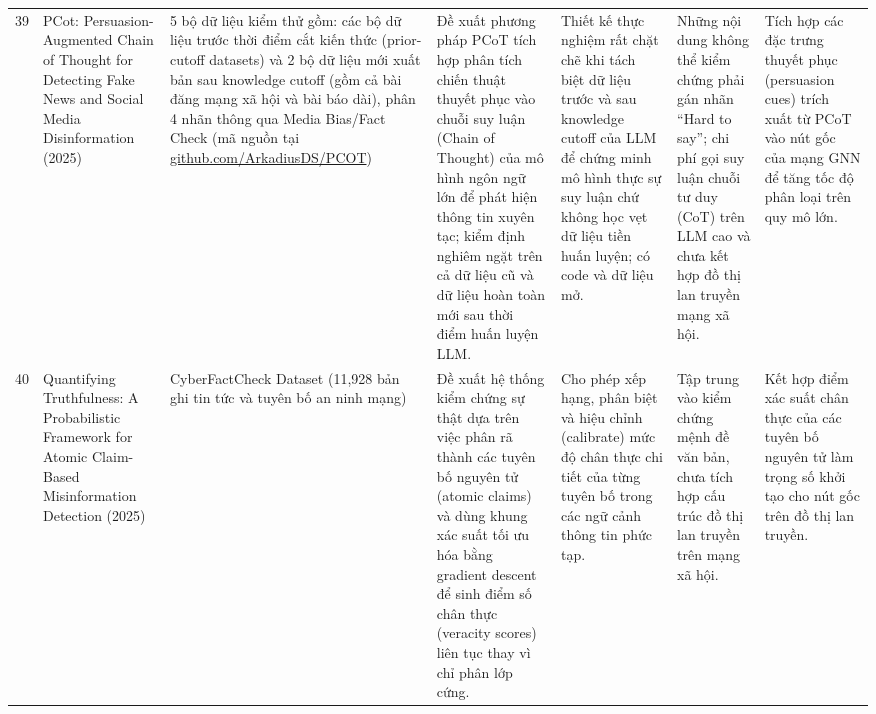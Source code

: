 \documentclass[11pt,a4paper]{extreport}
\begin{document}
\begin{landscape}
\begin{longtable}{@{}C{0.6cm}p{3.6cm}p{2.7cm}p{4.8cm}p{3.6cm}p{3.6cm}p{3.6cm}@{}}
39 & PCot: Persuasion-Augmented Chain of Thought for Detecting Fake News and Social Media Disinformation (2025) \cite{noauthor_pcot_2025} & 5 bộ dữ liệu kiểm thử gồm: các bộ dữ liệu trước thời điểm cắt kiến thức (prior-cutoff datasets) và 2 bộ dữ liệu mới xuất bản sau knowledge cutoff (gồm cả bài đăng mạng xã hội và bài báo dài), phân 4 nhãn thông qua Media Bias/Fact Check (mã nguồn tại \url{github.com/ArkadiusDS/PCOT}) & Đề xuất phương pháp PCoT tích hợp phân tích chiến thuật thuyết phục vào chuỗi suy luận (Chain of Thought) của mô hình ngôn ngữ lớn để phát hiện thông tin xuyên tạc; kiểm định nghiêm ngặt trên cả dữ liệu cũ và dữ liệu hoàn toàn mới sau thời điểm huấn luyện LLM. & Thiết kế thực nghiệm rất chặt chẽ khi tách biệt dữ liệu trước và sau knowledge cutoff của LLM để chứng minh mô hình thực sự suy luận chứ không học vẹt dữ liệu tiền huấn luyện; có code và dữ liệu mở. & Những nội dung không thể kiểm chứng phải gán nhãn ``Hard to say''; chi phí gọi suy luận chuỗi tư duy (CoT) trên LLM cao và chưa kết hợp đồ thị lan truyền mạng xã hội. & Tích hợp các đặc trưng thuyết phục (persuasion cues) trích xuất từ PCoT vào nút gốc của mạng GNN để tăng tốc độ phân loại trên quy mô lớn. \\ 

40 & Quantifying Truthfulness: A Probabilistic Framework for Atomic Claim-Based Misinformation Detection (2025) \cite{noauthor_quantifying_2025} & CyberFactCheck Dataset (11,928 bản ghi tin tức và tuyên bố an ninh mạng) & Đề xuất hệ thống kiểm chứng sự thật dựa trên việc phân rã thành các tuyên bố nguyên tử (atomic claims) và dùng khung xác suất tối ưu hóa bằng gradient descent để sinh điểm số chân thực (veracity scores) liên tục thay vì chỉ phân lớp cứng. & Cho phép xếp hạng, phân biệt và hiệu chỉnh (calibrate) mức độ chân thực chi tiết của từng tuyên bố trong các ngữ cảnh thông tin phức tạp. & Tập trung vào kiểm chứng mệnh đề văn bản, chưa tích hợp cấu trúc đồ thị lan truyền trên mạng xã hội. & Kết hợp điểm xác suất chân thực của các tuyên bố nguyên tử làm trọng số khởi tạo cho nút gốc trên đồ thị lan truyền. \\ 
\end{longtable}


\end{landscape}
\end{document}
